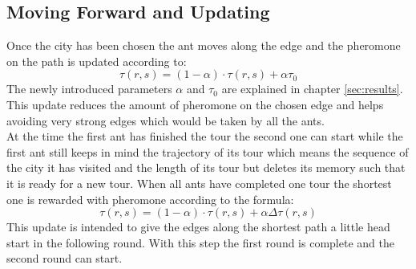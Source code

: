 \subsection{Moving Forward and Updating}
Once the city has been chosen the ant moves along the edge and the pheromone on the path is updated according to:
\begin{equation}
\tau (r,s) = (1-\alpha)\cdot \tau(r,s) + \alpha \tau_0
\label{eq:loctauupdate}
\end{equation}
The newly introduced parameters $\alpha$ and $\tau_0$ are explained in chapter \ref{sec:results}. This update reduces the amount of pheromone on the chosen edge and helps avoiding very strong edges which would be taken by all the ants. \\
At the time the first ant has finished the tour the second one can start while the first ant still keeps in mind the trajectory of its tour which means the sequence of the city it has visited and the length of its tour but deletes its memory such that it is ready for a new tour. When all ants have completed one tour the shortest one is rewarded with pheromone according to the formula:
\begin{equation}
\tau(r,s) = (1-\alpha)\cdot \tau(r,s) + \alpha \Delta \tau(r,s)
\label{eq:globalupdate}
\end{equation}
This update is intended to give the edges along the shortest path a little head start in the following round. With this step the first round is complete and the second round can start.